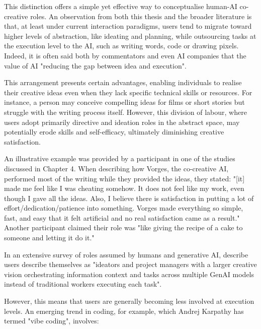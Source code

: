 This distinction offers a simple yet effective way to conceptualise human-AI co-creative roles. An observation from both this thesis and the broader literature is that, at least under current interaction paradigms, users tend to migrate toward higher levels of abstraction, like ideating and planning, while outsourcing tasks at the execution level to the AI, such as writing words, code or drawing pixels. Indeed, it is often said both by commentators and even AI companies that the value of AI "reducing the gap between idea and execution".

This arrangement presents certain advantages, enabling individuals to realise their creative ideas even when they lack specific technical skills or resources. For instance, a person may conceive compelling ideas for films or short stories but struggle with the writing process itself. However, this division of labour, where users adopt primarily directive and ideation roles in the abstract space, may potentially erode skills and self-efficacy, ultimately diminishing creative satisfaction.

An illustrative example was provided by a participant in one of the studies discussed in Chapter 4. When describing how Vorges, the co-creative AI, performed most of the writing while they provided the ideas, they stated: "[it] made me feel like I was cheating somehow. It does not feel like my work, even though I gave all the ideas. Also, I believe there is satisfaction in putting a lot of effort/dedication/patience into something. Vorges made everything so simple, fast, and easy that it felt artificial and no real satisfaction came as a result." Another participant claimed their role was "like giving the recipe of a cake to someone and letting it do it."


In an extensive survey of roles assumed by humans and generative AI, \cite{Palani2024-on} describe users describe themselves as "ideators and project managers with a larger creative vision orchestrating information context and tasks across multiple GenAI models instead of traditional workers executing each task". 

However, this means that users are generally becoming less involved at execution levels. An emerging trend in coding, for example, which Andrej Karpathy has termed "vibe coding", involves: 

